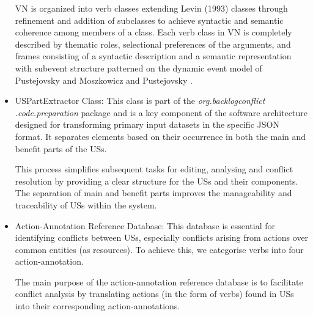 \begin{itemize}
	VN is organized into verb classes extending Levin (1993) classes through refinement and addition of subclasses to achieve syntactic and semantic coherence among members of a class. Each verb class in VN is completely described by thematic roles, selectional preferences of the arguments, and frames consisting of a syntactic description and a semantic representation with subevent structure patterned on the dynamic event model of Pustejovsky and Moszkowicz and Pustejovsky \cite{kipper2006extending}.
	
	\item USPartExtractor Class: This class is part of the \textit{org.backlogconflict .code.preparation} package and is a key component of the software architecture designed for transforming primary input datasets in the specific JSON format. It separates elements based on their occurrence in both the main and benefit parts of the USs.
	
	This process simplifies subsequent tasks for editing, analysing and conflict resolution by providing a clear structure for the USs and their components. The separation of main and benefit parts improves the manageability and traceability of USs within the system.
	
	\item Action-Annotation Reference Database: This database is essential for identifying conflicts between USs, especially conflicts arising from actions over common entities (as resources). To achieve this, we categorise verbs into four action-annotation.
	
	The main purpose of the action-annotation reference database is to facilitate conflict analysis by translating actions (in the form of verbs) found in USs into their corresponding action-annotations.
		
		
	

\end{itemize}
